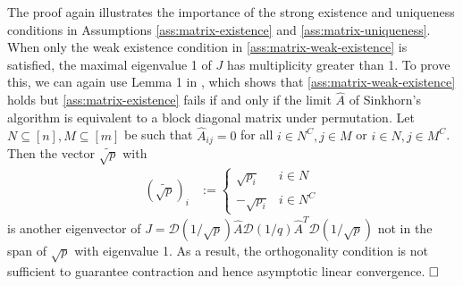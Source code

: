 The proof again illustrates the importance of the strong existence and uniqueness conditions in Assumptions \ref{ass:matrix-existence} and \ref{ass:matrix-uniqueness}. When only the weak existence condition in \cref{ass:matrix-weak-existence} is satisfied,
the maximal eigenvalue 1 of $J$ has multiplicity greater than 1. To prove this, we can again use Lemma 1 in \citet{pukelsheim2014biproportional}, which shows that \cref{ass:matrix-weak-existence} holds but \cref{ass:matrix-existence} fails if and only if the limit $\hat A$ of Sinkhorn's algorithm is equivalent to a block diagonal matrix under permutation. Let $N\subseteq [n],M\subseteq[m]$ be such that $\hat A_{ij}=0$ for all $i\in N^C,j\in M$ or $i\in N,j\in M^C$. Then the vector $\tilde{\sqrt{p}}$ with 
\begin{align*}
    (\tilde{\sqrt{p}})_{i}&:=\begin{cases}
\sqrt{p_{i}} & i\in N\\
-\sqrt{p_{i}} & i\in N^{C}
\end{cases}
\end{align*}
is another eigenvector of $J=\mathcal{D}(1/\sqrt{p})\hat{A}\mathcal{D}(1/q)\hat{A}^{T}\mathcal{D}(1/\sqrt{p})$ not in the span of $\sqrt{p}$ with eigenvalue 1. As a result, the orthogonality condition is not sufficient to guarantee contraction and hence asymptotic linear
convergence. $\hfill \square$


